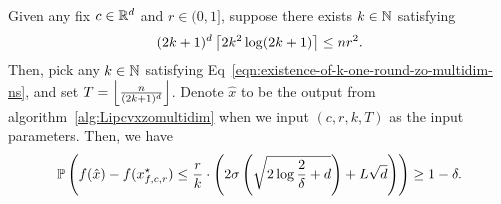 \begin{proposition}
\label{proposition:zeroth-order-nonsmooth-one-round-multidim}
Given any fix $c\in \mathbb{R}^d$ and $r \in (0, 1]$, suppose there exists $k \in \mathbb{N}$ satisfying 
\begin{equation}
\label{eqn:existence-of-k-one-round-zo-multidim-ns}
(2k + 1)^d \left\lceil{2k^2 \log (2k+1)}\right\rceil \leq nr^2.
\end{equation}
Then, pick any $k \in \mathbb{N}$ satisfying Eq~\eqref{eqn:existence-of-k-one-round-zo-multidim-ns}, 
and set $T= \left\lfloor{\frac{n}{(2k+1)^d}}\right\rfloor$. Denote $\hat{x}$ to be the output from 
algorithm~\ref{alg:Lipcvxzomultidim} when we input $(c, r, k, T)$ as the input parameters.
Then, we have 
\begin{equation*}
\mathbb{P}\left(f(\hat{x}) - f(x_{f, c, r}^\star) \leq \frac{r}{k} \cdot \left(2\sigma 
	\left(\sqrt{2 \log \frac{2}{\delta} + d} \right)+ L\sqrt{d}\right)
		\right)\geq 1-\delta.
\end{equation*}
\end{proposition}

